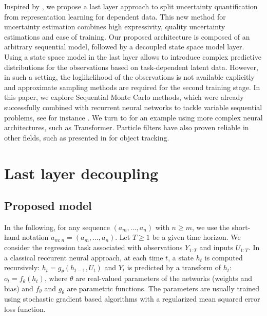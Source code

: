 \documentclass{article}
\begin{document}
Inspired by  \cite{Brosse2020OnLA}, we propose a last layer approach to split uncertainty quantification from representation learning for dependent data.  This new method for uncertainty estimation combines high expressivity, quality uncertainty estimations and ease of training. Our proposed architecture is composed of an arbitrary sequential model, followed by a decoupled state space model layer. Using a state space model in the last layer allows to introduce complex predictive distributions for the observations based on task-dependent latent data. However, in such a setting, the loglikelihood of the observations is not available explicitly and approximate sampling methods are required for the second training stage.   In this paper, we explore Sequential Monte Carlo methods, which were already successfully combined with recurrent neural networks to tackle variable sequential problems, see for instance \cite{Ma2020}.
We turn to \cite{Martin2020TheMC} for an example using more complex neural architectures, such as Transformer.
Particle filters have also proven reliable in other fields, such as presented in \cite{Liu2020LSTMPF} for object tracking.




\section{Last layer decoupling}
\label{sec:decoupling}

\subsection{Proposed model}%
\label{sub:proposed_architecture}

In the following, for any sequence $(a_m,\ldots, a_n)$ with $n\geq m$, we use the short-hand notation $a_{m:n} = (a_m,\ldots, a_n)$. Let $T\ge 1$ be a given time horizon. We consider the regression task associated with observations $Y_{1:T}$ and inputs $U_{1:T}$. In a classical reccurent neural approach, at each time $t$, a  state $h_t$ is computed recursively: $h_t = g_\theta(h_{t-1},U_t)$ and $Y_t$ is predicted by a transform of $h_t$: $o_t = f_\theta(h_t)$, where $\theta$ are real-valued parameters of the networks (weights and bias) and $f_\theta$ and $g_\theta$ are parametric functions. The parameters are usually trained using stochastic gradient based algorithms with a regularized mean squared error loss function.
\end{document}
